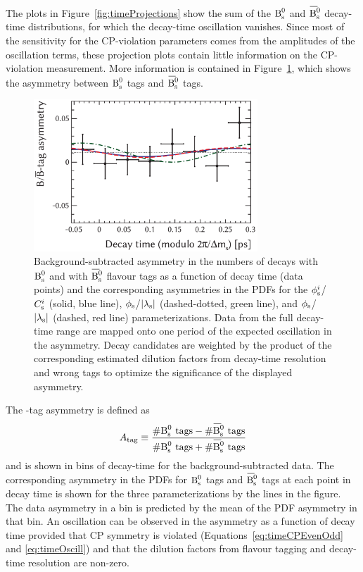The plots in Figure~\ref{fig:timeProjections} show the sum of the $\text{B}_\text{s}^\text{0}$ and $\Bsbar$ decay-time distributions, for which the decay-time
oscillation vanishes. Since most of the sensitivity for the CP-violation parameters comes from the amplitudes of the oscillation terms,
these projection plots contain little information on the CP-violation measurement. More information is contained in
Figure~\ref{fig:BBbarAsymmetry}, which shows the asymmetry between $\text{B}_\text{s}^\text{0}$ tags and $\Bsbar$ tags.
\begin{figure}[htb]
  \centering
  \includegraphics[width=0.75\textwidth]{graphics/results/asym}
  \caption{Background-subtracted asymmetry in the numbers of decays with $\text{B}_\text{s}^\text{0}$ and with $\Bsbar$ flavour tags as a function of decay time
           (data points) and the corresponding asymmetries in the PDFs for the $\phi_\text{s}^{i}$/$C_\text{s}^{i}$ (solid, blue line),
           $\phi_\text{s}$/$|{\lambda_{\text{s}}}|$ (dashed-dotted, green line), and $\phi_\text{s}$/$|{\lambda_{\text{s}}}|$ (dashed, red line) parameterizations.
           Data from the full decay-time range are mapped onto one period of the expected oscillation in the asymmetry.
           Decay candidates are weighted by the product of the corresponding estimated dilution factors from decay-time resolution
           and wrong tags to optimize the significance of the displayed asymmetry.}
  \label{fig:BBbarAsymmetry}
\end{figure}

The \BsBsbar-tag asymmetry is defined as
\[
  A_{\text{tag}} \equiv \frac{\#\Bs{}\text{ tags} - \#\Bsbar{}\text{ tags}}{\#\Bs{}\text{ tags} + \#\Bsbar{}\text{ tags}}
\]
and is shown in bins of decay-time for the background-subtracted data. The corresponding asymmetry in the PDFs for $\text{B}_\text{s}^\text{0}$ tags and $\Bsbar$
tags at each point in decay time is shown for the three parameterizations by the lines in the figure. The data asymmetry in a bin is
predicted by the mean of the PDF asymmetry in that bin. An oscillation can be observed in the asymmetry as a function of decay time
provided that CP symmetry is violated (Equations~\ref{eq:timeCPEvenOdd} and \ref{eq:timeOscill}) and that the dilution factors from flavour
tagging and decay-time resolution are non-zero.

